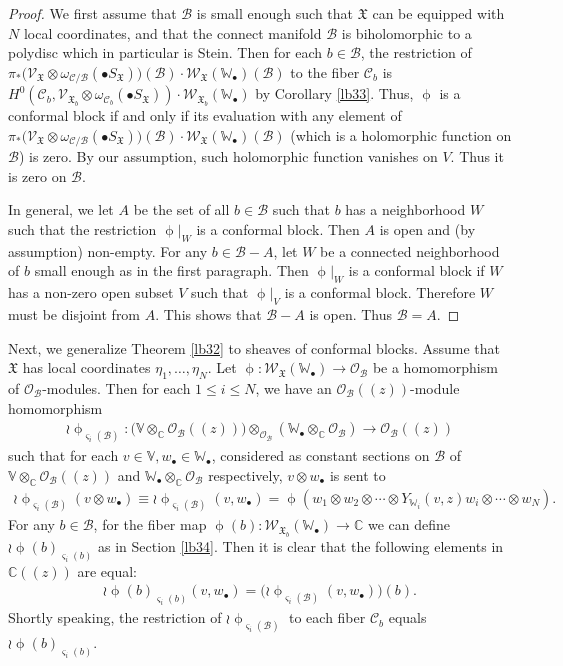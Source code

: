 \documentclass[12pt,a4paper,notitlepage]{report}
\theoremstyle{definition}
\theoremstyle{plain}
\newcommand{\fk}{\mathfrak}
\newcommand{\mc}{\mathcal}
\newcommand{\scr}{\mathscr}
\newcommand{\sgm}{\varsigma}
\newcommand{\blt}{\bullet}
\newcommand{\Vbb}{\mathbb V}
\newcommand{\Wbb}{\mathbb W}
\newcommand{\Cbb}{\mathbb C}
\numberwithin{equation}{section}
\begin{document}
\begin{proof}
We first assume that $\mc B$ is small enough such that $\fk X$ can be equipped with $N$ local coordinates,  and that the connect manifold $\mc B$ is biholomorphic to a polydisc which in particular is Stein. Then for each $b\in\mc B$, the restriction of $\pi_*\big(\scr V_{\fk X}\otimes\omega_{\mc C/\mc B}(\blt S_{\fk X})\big)(\mc B)\cdot \scr W_{\fk X}(\Wbb_\blt)(\mc B)$ to the fiber $\mc C_b$ is $H^0(\mc C_b,\scr V_{\fk X_b}\otimes\omega_{\mc C_b}(\blt S_{\fk X}))\cdot \scr W_{\fk X_b}(\Wbb_\blt)$ by Corollary \ref{lb33}. Thus, $\upphi$ is a conformal block if and only if its evaluation with any element of $\pi_*\big(\scr V_{\fk X}\otimes\omega_{\mc C/\mc B}(\blt S_{\fk X})\big)(\mc B)\cdot \scr W_{\fk X}(\Wbb_\blt)(\mc B)$ (which is a holomorphic function on $\mc B$) is zero. By our assumption, such holomorphic function vanishes on $V$. Thus it is zero on $\mc B$.

In general, we let $A$ be the set of all $b\in\mc B$ such that $b$ has a neighborhood $W$ such that the restriction $\upphi|_W$ is a conformal block. Then $A$ is open and (by assumption) non-empty. For any $b\in\mc B-A$, let $W$ be a connected neighborhood of $b$ small enough as in the first paragraph. Then $\upphi|_W$ is a conformal block if $W$ has a non-zero open subset $V$ such that $\upphi|_V$ is a conformal block. Therefore $W$ must be disjoint from $A$. This shows that $\mc B-A$ is open. Thus $\mc B=A$.
\end{proof}




Next, we generalize Theorem \ref{lb32} to sheaves of conformal blocks. Assume that $\fk X$ has local coordinates $\eta_1,\dots,\eta_N$.  Let $\upphi:\scr W_{\fk X}(\Wbb_\blt)\rightarrow \scr O_{\mc B}$ be a homomorphism of $\scr O_{\mc B}$-modules. Then for each $1\leq i\leq N$, we have an $\scr O_{\mc B}((z))$-module homomorphism
\begin{gather*}
\wr\upphi_{\sgm_i(\mc B)}:\big(\Vbb\otimes_\Cbb\scr O_{\mc B}((z))\big)\otimes_{\scr O_{\mc B}} (\Wbb_\blt\otimes_\Cbb\scr O_{\mc B})\rightarrow \scr O_{\mc B}((z))
\end{gather*}
such that for each $v\in\Vbb,w_\blt\in\Wbb_\blt$, considered as constant sections on $\mc B$ of  $\Vbb\otimes_\Cbb\scr O_{\mc B}((z))$ and $\Wbb_\blt\otimes_\Cbb\scr O_{\mc B}$ respectively, $v\otimes w_\blt$ is sent to
\begin{align}
\wr\upphi_{\sgm_i(\mc B)}(v\otimes w_\blt)\equiv\wr\upphi_{\sgm_i(\mc B)}(v,w_\blt)=\upphi(w_1\otimes w_2\otimes\cdots\otimes Y_{\Wbb_i}(v,z)w_i\otimes\cdots\otimes w_N).
\end{align}
For any $b\in\mc B$, for the fiber map $\upphi(b):\scr W_{\fk X_b}(\Wbb_\blt)\rightarrow\Cbb$ we can define $\wr\upphi(b)_{\sgm_i(b)}$ as in Section \ref{lb34}. Then it is clear that the following elements in $\Cbb((z))$ are equal:
\begin{align}
\wr\upphi(b)_{\sgm_i(b)}(v,w_\blt)=\big(\wr\upphi_{\sgm_i(\mc B)}(v,w_\blt)\big)(b).\label{eq100}
\end{align}
Shortly speaking, the restriction of $\wr\upphi_{\sgm_i(\mc B)}$ to each fiber $\mc C_b$ equals $\wr\upphi(b)_{\sgm_i(b)}$.
\end{document}
